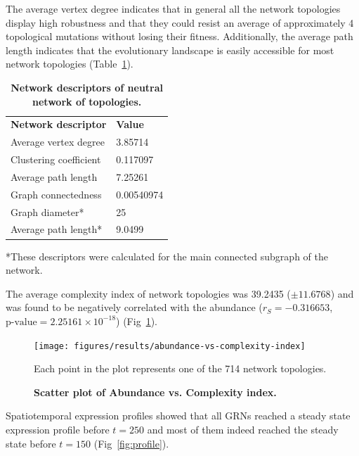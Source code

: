 \documentclass[10pt,letterpaper]{article}
\newlength\savedwidth
\newcommand\thickhline{\noalign{\global\savedwidth\arrayrulewidth\global\arrayrulewidth 2pt}%
\hline
\noalign{\global\arrayrulewidth\savedwidth}}
\begin{document}
The average vertex degree indicates that in general all the network topologies
display high robustness and that they could resist an average of approximately 4
topological mutations without losing their fitness. Additionally, the average
path length indicates that the evolutionary landscape is easily accessible for
most network topologies (Table~\ref{table1}).

\begin{table}[!ht]
 \centering
 \caption{{\bf Network descriptors of neutral network of topologies.}}
 \begin{tabular}{|l|l|}
 \hline
 {\bf Network descriptor} & {\bf Value}\\ \thickhline
 Average vertex degree  & 3.85714 \\ \hline
 Clustering coefficient \cite{Watts1998} & 0.117097 \\ \hline
 Average path length    & 7.25261       \\ \hline
 Graph connectedness    & 0.00540974    \\ \hline
 Graph diameter*        & 25            \\ \hline
 Average path length*   & 9.0499        \\ \hline
 \end{tabular}
 \begin{flushleft} *These descriptors were calculated for the main connected
 subgraph of the network.
 \end{flushleft}
 \label{table1}
 \end{table}

The average complexity index of network topologies was 39.2435 ($\pm 11.6768$)
and was found to be negatively correlated with the abundance ($r_S = -0.316653$,
$\text{p-value} = 2.25161\times10^{-18}$) (Fig~\ref{fig:ab-comp}).

\begin{figure}[!h]
 \texttt{[image: figures/results/abundance-vs-complexity-index]}
 \caption{\bf Scatter plot of Abundance vs. Complexity index.}
 Each point in the plot represents one of the 714 network topologies.
 \label{fig:ab-comp}
\end{figure}

Spatiotemporal expression profiles showed that all GRNs reached a steady state
expression profile before $t = 250$ and most of them indeed reached the steady
state before $t = 150$ (Fig~\ref{fig:profile}).
\end{document}
